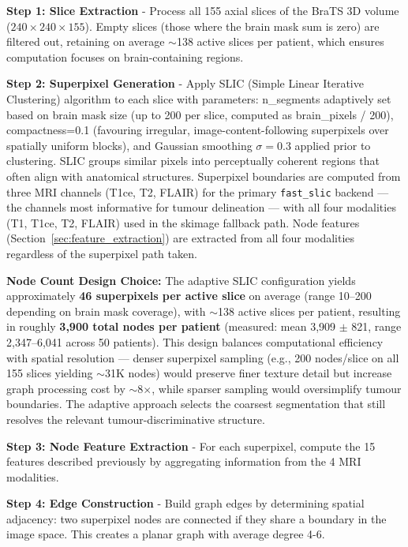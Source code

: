 \documentclass{article}
\begin{document}
\textbf{Step 1: Slice Extraction} - Process all 155 axial slices of the BraTS 3D volume ($240 \times 240 \times 155$). Empty slices (those where the brain mask sum is zero) are filtered out, retaining on average $\sim$138 active slices per patient, which ensures computation focuses on brain-containing regions.

\textbf{Step 2: Superpixel Generation} - Apply SLIC (Simple Linear Iterative Clustering) \cite{achanta2012slic} algorithm to each slice with parameters: n\_segments adaptively set based on brain mask size (up to 200 per slice, computed as brain\_pixels / 200), compactness=0.1 (favouring irregular, image-content-following superpixels over spatially uniform blocks), and Gaussian smoothing $\sigma=0.3$ applied prior to clustering. SLIC groups similar pixels into perceptually coherent regions that often align with anatomical structures. Superpixel boundaries are computed from three MRI channels (T1ce, T2, FLAIR) for the primary \texttt{fast\_slic} backend — the channels most informative for tumour delineation — with all four modalities (T1, T1ce, T2, FLAIR) used in the skimage fallback path. Node features (Section~\ref{sec:feature_extraction}) are extracted from all four modalities regardless of the superpixel path taken.

\textbf{Node Count Design Choice:} The adaptive SLIC configuration yields approximately \textbf{46 superpixels per active slice} on average (range 10--200 depending on brain mask coverage), with $\sim$138 active slices per patient, resulting in roughly \textbf{3,900 total nodes per patient} (measured: mean 3,909 $\pm$ 821, range 2,347--6,041 across 50 patients). This design balances computational efficiency with spatial resolution — denser superpixel sampling (e.g., 200 nodes/slice on all 155 slices yielding $\sim$31K nodes) would preserve finer texture detail but increase graph processing cost by $\sim$8$\times$, while sparser sampling would oversimplify tumour boundaries. The adaptive approach selects the coarsest segmentation that still resolves the relevant tumour-discriminative structure.

\textbf{Step 3: Node Feature Extraction} - For each superpixel, compute the 15 features described previously by aggregating information from the 4 MRI modalities.

\textbf{Step 4: Edge Construction} - Build graph edges by determining spatial adjacency: two superpixel nodes are connected if they share a boundary in the image space. This creates a planar graph with average degree 4-6.
\end{document}
